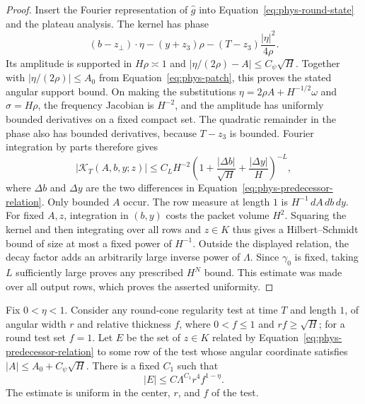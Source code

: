\begin{proof}
Insert the Fourier representation of $\widehat g$ into
Equation~\eqref{eq:phys-round-state} and the plateau analysis.  The
kernel has phase
\[
 (b-z_\perp)\cdot\eta-(y+z_3)\rho
                  -(T-z_3)\frac{|\eta|^2}{4\rho}.
\]
Its amplitude is supported in $H\rho\asymp1$ and
$|\eta/(2\rho)-A|\le C_\psi\sqrt H$.
Together with $|\eta/(2\rho)|\le A_0$ from
Equation~\eqref{eq:phys-patch}, this proves the stated angular
support bound.  On making the substitutions
$\eta=2\rho A+H^{-1/2}\omega$ and $\sigma=H\rho$, the frequency
Jacobian is $H^{-2}$, and the amplitude has uniformly bounded
derivatives on a fixed compact set.  The quadratic remainder in the
phase also has bounded derivatives, because $T-z_3$ is bounded.
Fourier integration by parts therefore gives
\[
 |\mathcal K_T(A,b,y;z)|\le C_L H^{-2}
 \left(1+\frac{|\Delta b|}{\sqrt H}
              +\frac{|\Delta y|}{H}\right)^{-L},
\]
where $\Delta b$ and $\Delta y$ are the two differences in
Equation~\eqref{eq:phys-predecessor-relation}.  Only bounded $A$ occur.
The row measure at length $1$ is $H^{-1}\,dA\,db\,dy$.
For fixed $A,z$, integration in $(b,y)$ costs the packet volume
$H^2$.  Squaring the kernel and then integrating over all rows and
$z\in K$ thus gives a Hilbert--Schmidt bound of size at most a fixed
power of $H^{-1}$.  Outside the displayed relation, the decay factor
adds an arbitrarily large inverse power of $\Lambda$.
Since $\gamma_0$ is fixed, taking $L$ sufficiently large proves any
prescribed $H^N$ bound.  This estimate was made over all output rows,
which proves the asserted uniformity.
\end{proof}

\begin{lemma}
\label{lem:phys-predecessor-volume}
Fix $0<\eta<1$.  Consider any round-cone regularity test at time $T$
and length $1$, of angular width $r$ and relative thickness $f$,
where $0<f\le1$ and $rf\ge\sqrt H$; for a round test set $f=1$.
Let $E$ be the set of $z\in K$ related by
Equation~\eqref{eq:phys-predecessor-relation} to some row of the test
whose angular coordinate satisfies $|A|\le A_0+C_\psi\sqrt H$.
There is a fixed $C_1$ such that
\begin{equation}
 |E|\le C\Lambda^{C_1}r^4 f^{1-\eta}.
 \label{eq:phys-predecessor-volume}
\end{equation}
The estimate is uniform in the center, $r$, and $f$ of the test.
\end{lemma}

